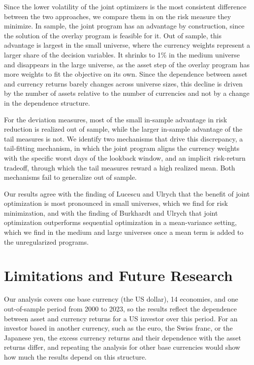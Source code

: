 Since the lower volatility of the joint optimizers is the most consistent difference between the two approaches, we
compare them in  on the risk measure they minimize. In sample, the joint program has an
advantage by construction, since the solution of the overlay program is feasible for it. Out of sample, 
this advantage is largest in the small universe, where the currency weights represent a larger 
share of the decision variables. It shrinks to 1\% in the medium universe and 
disappears in the large universe, as the asset step of the overlay program has more weights to fit the objective on its own.
Since the dependence
between asset and currency returns barely changes across universe sizes, this decline is driven by the
number of assets relative to the number of currencies and not by a change in the dependence structure.

For the deviation measures, most of the small in-sample advantage in risk reduction is realized out of sample, while the larger in-sample
advantage of the tail measures is not. We identify two mechanisms that drive this discrepancy, a tail-fitting mechanism,
in which the joint program aligns the currency weights with the specific worst days of the lookback window, and an
implicit risk-return tradeoff, through which the tail measures reward a high realized mean. Both
mechanisms fail to generalize out of sample. 


Our results agree with the finding of Lucescu and Ulrych \cite{RegularizedMultiCurrencyExpectedShortfallPortfolios} that the benefit of
joint optimization is most pronounced in small universes, which we find for risk minimization, and with the finding of Burkhardt and Ulrych
\cite{SparseAndStableInternationalPortfolioOptimization} that joint optimization outperforms sequential optimization in a
mean-variance setting, which we find in the medium and large universes once a mean term is added to the unregularized
programs. 

\newpage
\section{Limitations and Future Research}\label{sec:conclusion-limitations}

Our analysis covers one base currency (the US dollar), 14 economies, and one out-of-sample period from 2000 to 2023,
so the results reflect the dependence between asset and currency returns for a US investor over this period. For
an investor based in another currency, such as the euro, the Swiss franc, or the Japanese yen, the excess currency returns
and their dependence with the asset returns differ, and repeating the analysis for other base currencies would show how
much the results depend on this structure.

